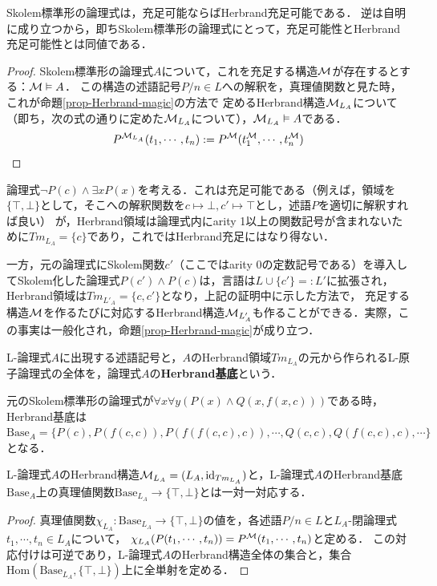 \documentclass[uplatex, dvipdfmx]{jsreport}
\begin{document}
\begin{proposition}
    Skolem標準形の論理式は，充足可能ならばHerbrand充足可能である．
    逆は自明に成り立つから，即ちSkolem標準形の論理式にとって，充足可能性とHerbrand充足可能性とは同値である．
\end{proposition}
\begin{proof}
    Skolem標準形の論理式$A$について，これを充足する構造$\mathcal{M}$が存在するとする：$\mathcal{M}\vDash A$．
    この構造の述語記号$P/n\in L$への解釈を，真理値関数と見た時，これが命題\ref{prop-Herbrand-magic}の方法で
    定めるHerbrand構造$\mathcal{M}_{L_A}$について（即ち，次の式の通りに定めた$\mathcal{M}_{L_A}$について），$\mathcal{M}_{L_A}\vDash A$である．
    \[ P^{\mathcal{M}_{L_A}}(t_1,\cdots,t_n) := P^{\mathcal{M}}(t_1^{\mathcal{M}},\cdots,t_n^{\mathcal{M}}) \]
\end{proof}
\begin{example}
    論理式$\lnot P(c)\land\exists xP(x)$を考える．これは充足可能である（例えば，領域を$\{\top,\bot\}$として，そこへの解釈関数を$c\mapsto\bot,c'\mapsto\top$とし，述語$P$を適切に解釈すれば良い）
    が，Herbrand領域は論理式内にarity 1以上の関数記号が含まれないために$Tm_{L_A}=\{c\}$であり，これではHerbrand充足にはなり得ない．
    
    一方，元の論理式にSkolem関数$c'$（ここではarity 0の定数記号である）を導入してSkolem化した論理式$P(c')\land P(c)$は，言語は$L\cup\{c'\}=:L'$に拡張され，Herbrand領域は$Tm_{L'_A}=\{c,c'\}$となり，上記の証明中に示した方法で，
    充足する構造$\mathcal{M}$を作るたびに対応するHerbrand構造$\mathcal{M}_{L'_A}$も作ることができる．実際，この事実は一般化され，命題\ref{prop-Herbrand-magic}が成り立つ．
\end{example}

\begin{definition}
    L-論理式$A$に出現する述語記号と，$A$のHerbrand領域$Tm_{L_A}$の元から作られるL-原子論理式の全体を，論理式$A$の\textbf{Herbrand基底}という．
\end{definition}
\begin{example}
    元のSkolem標準形の論理式が$\forall x\forall y(P(x)\land Q(x,f(x,c)))$である時，Herbrand基底は$\mathrm{Base}_A=\{P(c),P(f(c,c)),P(f(f(c,c),c)),\cdots,Q(c,c),Q(f(c,c),c),\cdots\}$となる．
\end{example}

\begin{proposition}[Herbrand構造と付値]\label{prop-Herbrand-magic}
    L-論理式$A$のHerbrand構造$\mathcal{M}_{L_A}=(L_A,\mathrm{id}_{Tm_{L_A}})$と，L-論理式$A$のHerbrand基底$\mathrm{Base}_{A}$上の真理値関数$\mathrm{Base}_{L_A}\to\{\top,\bot\}$とは一対一対応する．
\end{proposition}
\begin{proof}
    真理値関数$\chi_{L_A}:\mathrm{Base}_{L_A}\to\{\top,\bot\}$の値を，各述語$P/n\in L$と$L_A$-閉論理式$t_1,\cdots,t_n\in L_A$について，
    $\chi_{L_A}(P(t_1,\cdots,t_n))=P^{\mathcal{M}}(t_1,\cdots,t_n)$と定める．
    この対応付けは可逆であり，L-論理式$A$のHerbrand構造全体の集合と，集合$\mathrm{Hom}(\mathrm{Base}_{L_A},\{\top,\bot\})$上に全単射を定める．
\end{proof}
\end{document}
